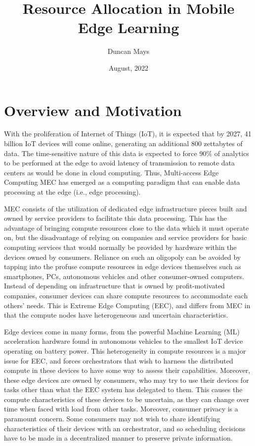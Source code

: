 \documentclass{article}
\begin{document}
\title{Resource Allocation in Mobile Edge Learning}
\author{Duncan Mays}
\date{August, 2022}

\maketitle

\section{Overview and Motivation}

With the proliferation of Internet of Things (IoT), it is expected that by 2027, 41 billion IoT devices will come online, generating an additional 800 zettabytes of data. The time-sensitive nature of this data is expected to force 90\% of analytics to be performed at the edge to avoid latency of transmission to remote data centers as would be done in cloud computing. Thus, Multi-access Edge Computing MEC has emerged as a computing paradigm that can enable data processing at the edge (i.e., edge processing).

MEC consists of the utilization of dedicated edge infrastructure pieces built and owned by service providers to facilitate this data processing. This has the advantage of bringing compute resources close to the data which it must operate on, but the disadvantage of relying on companies and service providers for basic computing services that would normally be provided by hardware within the devices owned by consumers. Reliance on such an oligopoly can be avoided by tapping into the profuse compute resources in edge devices themselves such as smartphones, PCs, autonomous vehicles and other consumer-owned computers. Instead of depending on infrastructure that is owned by profit-motivated companies, consumer devices can share compute resources to accommodate each others’ needs. This is Extreme Edge Computing (EEC), and differs from MEC in that the compute nodes have heterogeneous and uncertain characteristics.

Edge devices come in many forms, from the powerful Machine Learning (ML) acceleration hardware found in autonomous vehicles to the smallest IoT device operating on battery power. This heterogeneity in compute resources is a major issue for EEC, and forces orchestrators that wish to harness the distributed compute in these devices to have some way to assess their capabilities. Moreover, these edge devices are owned by consumers, who may try to use their devices for tasks other than what the EEC system has delegated to them. This causes the compute characteristics of these devices to be uncertain, as they can change over time when faced with load from other tasks. Moreover, consumer privacy is a paramount concern. Some consumers may not wish to share identifying characteristics of their devices with an orchestrator, and so scheduling decisions have to be made in a decentralized manner to preserve private information.
\end{document}
